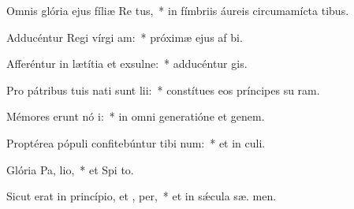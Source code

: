 \item Omnis glória ejus fíliæ Re  tus,~* in fímbriis áureis circumamícta tibus.
\item Adducéntur Regi vírgi  am:~* próximæ ejus af bi.
\item Afferéntur in lætítia et exsulne:~* adducéntur   gis.
\item Pro pátribus tuis nati sunt  lii:~* constítues eos príncipes su  ram.
\item Mémores erunt nó i:~* in omni generatióne et genem.
\item Proptérea pópuli confitebúntur tibi  num:~* et in  culi.
\item Glória Pa,  lio,~* et Spi to.
\item Sicut erat in princípio, et ,  per,~* et in sǽcula sæ. men.
